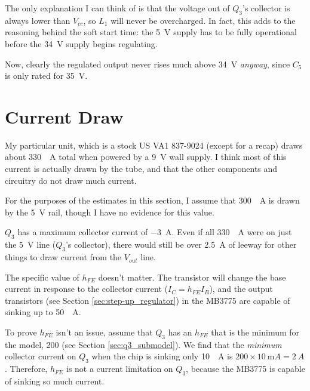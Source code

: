 \documentclass{article}
\newcommand{\Vcc}{$V_{cc}$}
\newcommand{\Vout}{$V_{out}$}
\newcommand{\model}{\textsf}
\begin{document}
The only explanation I can think of is that the voltage out of $Q_3$'s
collector is always lower than \Vcc{}, so $L_1$ will never be
overcharged. In fact, this adds to the reasoning behind the soft start
time: the \qty{5}{\volt} supply has to be fully operational before the
\qty{34}{\volt} supply begins regulating.

Now, clearly the regulated output never rises much above
\qty{34}{\volt} \textit{anyway}, since $C_5$ is only rated for
\qty{35}{\volt}.

\section{Current Draw}
\label{sec:current_draw}
My particular unit, which is a stock \model{US VA1 837-9024} (except
for a recap) draws about \qty{330}{\milli{}A} total when powered by a
\qty{9}{\volt} wall supply. I think most of this current is actually
drawn by the tube, and that the other components and circuitry do not
draw much current.

For the purposes of the estimates in this section, I assume that
\qty{300}{\milli{}A} is drawn by the \qty{5}{\volt} rail, though I
have no evidence for this value.

$Q_3$ has a maximum collector current of \qty{-3}{A}. Even if all
\qty{330}{\milli{}A} were on just the \qty{5}{\volt} line ($Q_3$'s
collector), there would still be over \qty{2.5}{A} of leeway for other
things to draw current from the \Vout{} line.

The specific value of $h_{FE}$ doesn't matter. The transistor will
change the base current in response to the collector current
($I_C=h_{FE}I_B$), and the output transistors (see Section
\ref{sec:step-up_regulator}) in the \model{MB3775} are capable of
sinking up to \qty{50}{\milli{}A}.

To prove $h_{FE}$ isn't an issue, assume that $Q_3$ has an $h_{FE}$
that is the minimum for the model, 200 (see Section
\ref{sec:q3_submodel}).  We find that the \textit{minimum} collector
current on $Q_3$ when the chip is sinking only \qty{10}{\milli{}A} is
$200\times{}\qty{10}{\milli{}A}=\qty{2}{A}$. Therefore, $h_{FE}$ is
not a current limitation on $Q_3$, because the \model{MB3775} is
capable of sinking so much current.
\end{document}
